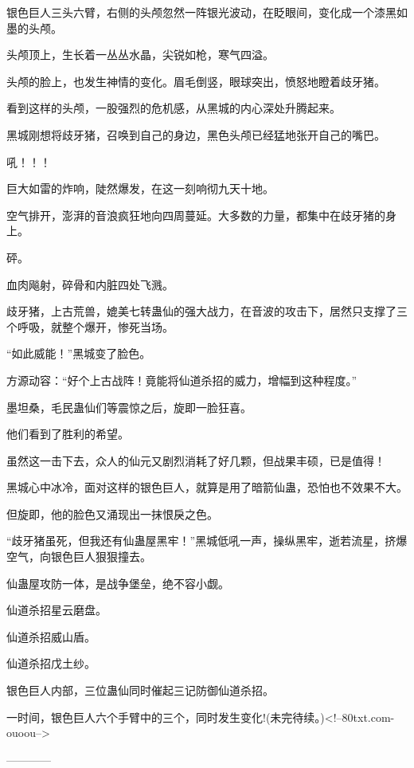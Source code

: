 \begin{this_body}
银色巨人三头六臂，右侧的头颅忽然一阵银光波动，在眨眼间，变化成一个漆黑如墨的头颅。

头颅顶上，生长着一丛丛水晶，尖锐如枪，寒气四溢。

头颅的脸上，也发生神情的变化。眉毛倒竖，眼球突出，愤怒地瞪着歧牙猪。

看到这样的头颅，一股强烈的危机感，从黑城的内心深处升腾起来。

黑城刚想将歧牙猪，召唤到自己的身边，黑色头颅已经猛地张开自己的嘴巴。

吼！！！

巨大如雷的炸响，陡然爆发，在这一刻响彻九天十地。

空气排开，澎湃的音浪疯狂地向四周蔓延。大多数的力量，都集中在歧牙猪的身上。

砰。

血肉飚射，碎骨和内脏四处飞溅。

歧牙猪，上古荒兽，媲美七转蛊仙的强大战力，在音波的攻击下，居然只支撑了三个呼吸，就整个爆开，惨死当场。

“如此威能！”黑城变了脸色。

方源动容：“好个上古战阵！竟能将仙道杀招的威力，增幅到这种程度。”

墨坦桑，毛民蛊仙们等震惊之后，旋即一脸狂喜。

他们看到了胜利的希望。

虽然这一击下去，众人的仙元又剧烈消耗了好几颗，但战果丰硕，已是值得！

黑城心中冰冷，面对这样的银色巨人，就算是用了暗箭仙蛊，恐怕也不效果不大。

但旋即，他的脸色又涌现出一抹恨戾之色。

“歧牙猪虽死，但我还有仙蛊屋黑牢！”黑城低吼一声，操纵黑牢，逝若流星，挤爆空气，向银色巨人狠狠撞去。

仙蛊屋攻防一体，是战争堡垒，绝不容小觑。

仙道杀招星云磨盘。

仙道杀招威山盾。

仙道杀招戊土纱。

银色巨人内部，三位蛊仙同时催起三记防御仙道杀招。

一时间，银色巨人六个手臂中的三个，同时发生变化!(未完待续。)<!--80txt.com-ouoou-->

------------

\end{this_body}

